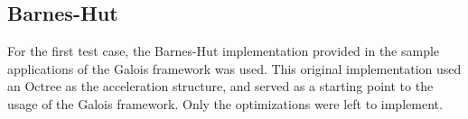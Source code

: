 \subsection{Barnes-Hut}
\label{sec:cases:barnes}

For the first test case, the Barnes-Hut implementation provided in the sample applications of the Galois framework was used.
This original implementation used an Octree as the acceleration structure, and served as a starting point to the usage of the Galois framework. Only the optimizations were left to implement.